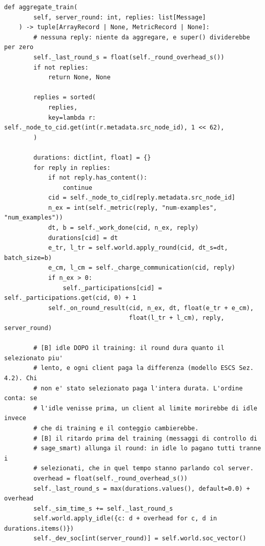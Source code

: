 \documentclass[11pt,a4paper]{article}
\begin{document}
\begin{lstlisting}[style=py,firstnumber=297,caption={\texttt{tesifl/strategies/fedavg.py}, lines 297--361}]
    def aggregate_train(
        self, server_round: int, replies: list[Message]
    ) -> tuple[ArrayRecord | None, MetricRecord | None]:
        # nessuna reply: niente da aggregare, e super() dividerebbe per zero
        self._last_round_s = float(self._round_overhead_s())
        if not replies:
            return None, None

        replies = sorted(
            replies,
            key=lambda r: self._node_to_cid.get(int(r.metadata.src_node_id), 1 << 62),
        )

        durations: dict[int, float] = {}
        for reply in replies:
            if not reply.has_content():
                continue
            cid = self._node_to_cid[reply.metadata.src_node_id]
            n_ex = int(self._metric(reply, "num-examples", "num_examples"))
            dt, b = self._work_done(cid, n_ex, reply)
            durations[cid] = dt
            e_tr, l_tr = self.world.apply_round(cid, dt_s=dt, batch_size=b)
            e_cm, l_cm = self._charge_communication(cid, reply)
            if n_ex > 0:
                self._participations[cid] = self._participations.get(cid, 0) + 1
            self._on_round_result(cid, n_ex, dt, float(e_tr + e_cm),
                                  float(l_tr + l_cm), reply, server_round)

        # [B] idle DOPO il training: il round dura quanto il selezionato piu'
        # lento, e ogni client paga la differenza (modello ESCS Sez. 4.2). Chi
        # non e' stato selezionato paga l'intera durata. L'ordine conta: se
        # l'idle venisse prima, un client al limite morirebbe di idle invece
        # che di training e il conteggio cambierebbe.
        # [B] il ritardo prima del training (messaggi di controllo di
        # sage_smart) allunga il round: in idle lo pagano tutti tranne i
        # selezionati, che in quel tempo stanno parlando col server.
        overhead = float(self._round_overhead_s())
        self._last_round_s = max(durations.values(), default=0.0) + overhead
        self._sim_time_s += self._last_round_s
        self.world.apply_idle({c: d + overhead for c, d in durations.items()})
        self._dev_soc[int(server_round)] = self.world.soc_vector()


\end{lstlisting}
\end{document}
